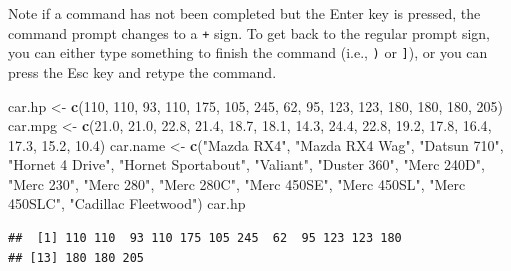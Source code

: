 \documentclass[
]{krantz}
\newenvironment{Shaded}{\begin{snugshade}}{\end{snugshade}}
\newcommand{\DecValTok}[1]{\textcolor[rgb]{0.00,0.00,0.81}{#1}}
\newcommand{\FloatTok}[1]{\textcolor[rgb]{0.00,0.00,0.81}{#1}}
\newcommand{\KeywordTok}[1]{\textcolor[rgb]{0.13,0.29,0.53}{\textbf{#1}}}
\newcommand{\NormalTok}[1]{#1}
\newcommand{\StringTok}[1]{\textcolor[rgb]{0.31,0.60,0.02}{#1}}
\begin{document}
Note if a command has not been completed but the Enter key is pressed, the command prompt changes to a \texttt{+} sign. To get back to the regular prompt sign, you can either type something to finish the command (i.e., \texttt{)} or \texttt{{]}}), or you can press the Esc key and retype the command.

\begin{Shaded}
\begin{Highlighting}[]
\NormalTok{car.hp \textless{}{-}}\StringTok{ }\KeywordTok{c}\NormalTok{(}\DecValTok{110}\NormalTok{, }\DecValTok{110}\NormalTok{, }\DecValTok{93}\NormalTok{, }\DecValTok{110}\NormalTok{, }\DecValTok{175}\NormalTok{, }\DecValTok{105}\NormalTok{, }\DecValTok{245}\NormalTok{, }\DecValTok{62}\NormalTok{, }\DecValTok{95}\NormalTok{, }\DecValTok{123}\NormalTok{, }
        \DecValTok{123}\NormalTok{, }\DecValTok{180}\NormalTok{, }\DecValTok{180}\NormalTok{, }\DecValTok{180}\NormalTok{, }\DecValTok{205}\NormalTok{)}
\NormalTok{car.mpg \textless{}{-}}\StringTok{ }\KeywordTok{c}\NormalTok{(}\FloatTok{21.0}\NormalTok{, }\FloatTok{21.0}\NormalTok{, }\FloatTok{22.8}\NormalTok{, }\FloatTok{21.4}\NormalTok{, }\FloatTok{18.7}\NormalTok{, }\FloatTok{18.1}\NormalTok{, }\FloatTok{14.3}\NormalTok{, }\FloatTok{24.4}\NormalTok{, }
         \FloatTok{22.8}\NormalTok{, }\FloatTok{19.2}\NormalTok{, }\FloatTok{17.8}\NormalTok{, }\FloatTok{16.4}\NormalTok{, }\FloatTok{17.3}\NormalTok{, }\FloatTok{15.2}\NormalTok{, }\FloatTok{10.4}\NormalTok{)}
\NormalTok{car.name \textless{}{-}}\StringTok{ }\KeywordTok{c}\NormalTok{(}\StringTok{"Mazda RX4"}\NormalTok{, }\StringTok{"Mazda RX4 Wag"}\NormalTok{, }\StringTok{"Datsun 710"}\NormalTok{, }
              \StringTok{"Hornet 4 Drive"}\NormalTok{, }\StringTok{"Hornet Sportabout"}\NormalTok{, }\StringTok{"Valiant"}\NormalTok{, }
              \StringTok{"Duster 360"}\NormalTok{, }\StringTok{"Merc 240D"}\NormalTok{, }\StringTok{"Merc 230"}\NormalTok{, }\StringTok{"Merc 280"}\NormalTok{, }
              \StringTok{"Merc 280C"}\NormalTok{, }\StringTok{"Merc 450SE"}\NormalTok{, }\StringTok{"Merc 450SL"}\NormalTok{, }
              \StringTok{"Merc 450SLC"}\NormalTok{, }\StringTok{"Cadillac Fleetwood"}\NormalTok{)}
\NormalTok{car.hp}
\end{Highlighting}
\end{Shaded}

\begin{verbatim}
##  [1] 110 110  93 110 175 105 245  62  95 123 123 180
## [13] 180 180 205
\end{verbatim}
\end{document}
